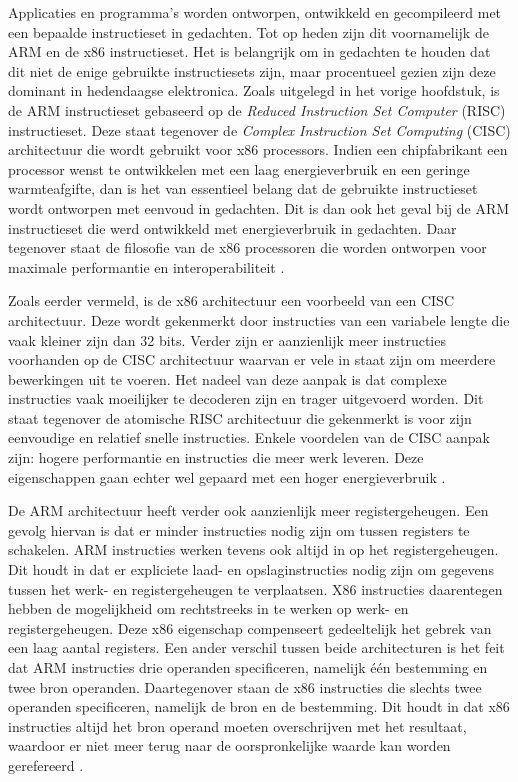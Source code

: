 Applicaties en programma’s worden ontworpen, ontwikkeld en gecompileerd met een bepaalde instructieset in gedachten. Tot op heden zijn dit voornamelijk de ARM en de x86 instructieset. Het is belangrijk om in gedachten te houden dat dit niet de enige gebruikte instructiesets zijn, maar procentueel gezien zijn deze dominant in hedendaagse elektronica. Zoals uitgelegd in het vorige hoofdstuk, is de ARM instructieset gebaseerd op de \textit{Reduced Instruction Set Computer} (RISC) instructieset. Deze staat tegenover de \textit{Complex Instruction Set Computing} (CISC) architectuur die wordt gebruikt voor x86 processors. Indien een chipfabrikant een processor wenst te ontwikkelen met een laag energieverbruik en een geringe warmteafgifte, dan is het van essentieel belang dat de gebruikte instructieset wordt ontworpen met eenvoud in gedachten. Dit is dan ook het geval bij de ARM instructieset die werd ontwikkeld met energieverbruik in gedachten. Daar tegenover staat de filosofie van de x86 processoren die worden ontworpen voor maximale performantie en interoperabiliteit \autocite{Triggs2022}.

Zoals eerder vermeld, is de x86 architectuur een voorbeeld van een CISC architectuur. Deze wordt gekenmerkt door instructies van een variabele lengte die vaak kleiner zijn dan 32 bits. Verder zijn er aanzienlijk meer instructies voorhanden op de CISC architectuur waarvan er vele in staat zijn om meerdere bewerkingen uit te voeren. Het nadeel van deze aanpak is dat complexe instructies vaak moeilijker te decoderen zijn en trager uitgevoerd worden. Dit staat tegenover de atomische RISC architectuur die gekenmerkt is voor zijn eenvoudige en relatief snelle instructies. Enkele voordelen van de CISC aanpak zijn: hogere performantie en instructies die meer werk leveren. Deze eigenschappen gaan echter wel gepaard met een hoger energieverbruik \autocite{SarahHarris2015}. 

De ARM architectuur heeft verder ook aanzienlijk meer registergeheugen. Een gevolg hiervan is dat er minder instructies nodig zijn om tussen registers te schakelen. ARM instructies werken tevens ook altijd in op het registergeheugen. Dit houdt in dat er expliciete laad- en opslaginstructies nodig zijn om gegevens tussen het werk- en registergeheugen te verplaatsen. X86 instructies daarentegen hebben de mogelijkheid om rechtstreeks in te werken op werk- en registergeheugen. Deze x86 eigenschap compenseert gedeeltelijk het gebrek van een laag aantal registers. Een ander verschil tussen beide architecturen is het feit dat ARM instructies drie operanden specificeren, namelijk één bestemming en twee bron operanden. Daartegenover staan de x86 instructies die slechts twee operanden specificeren, namelijk de bron en de bestemming. Dit houdt in dat x86 instructies altijd het bron operand moeten overschrijven met het resultaat, waardoor er niet meer terug naar de oorspronkelijke waarde kan worden gerefereerd \autocite{SarahHarris2015}. 

